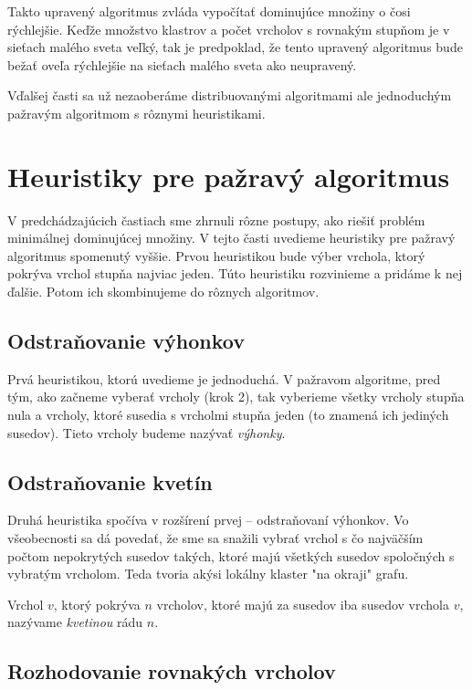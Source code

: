 Takto upravený algoritmus zvláda vypočítať dominujúce množiny o čosi 
rýchlejšie. Keďže množstvo klastrov a počet vrcholov s rovnakým stupňom je v 
sieťach malého sveta veľký, tak je predpoklad, že tento upravený algoritmus 
bude bežať oveľa rýchlejšie na sieťach malého sveta ako neupravený.

Vďalšej časti sa už nezaoberáme distribuovanými algoritmami ale jednoduchým 
pažravým algoritmom s rôznymi heuristikami.


\section{Heuristiky pre pažravý algoritmus}

V predchádzajúcich častiach sme zhrnuli rôzne postupy, ako riešiť problém 
minimálnej dominujúcej množiny. V tejto časti uvedieme heuristiky pre pažravý 
algoritmus spomenutý vyššie. Prvou heuristikou bude výber vrchola, ktorý 
pokrýva vrchol stupňa najviac jeden. Túto heuristiku rozvinieme a pridáme k 
nej ďalšie. Potom ich skombinujeme do rôznych algoritmov.

\subsection{Odstraňovanie výhonkov}

Prvá heuristikou, ktorú uvedieme je jednoduchá. V pažravom algoritme, pred tým, 
ako začneme vyberať vrcholy (krok 2), tak vyberieme všetky vrcholy stupňa nula 
a vrcholy, ktoré susedia s vrcholmi stupňa jeden (to znamená ich jediných 
susedov). Tieto vrcholy budeme nazývať \emph{výhonky}.


\subsection{Odstraňovanie kvetín}

Druhá heuristika spočíva v rozšírení prvej -- odstraňovaní výhonkov. Vo 
všeobecnosti sa dá povedať, že sme sa snažili vybrať vrchol s čo najväčším 
počtom nepokrytých susedov takých, ktoré majú všetkých susedov spoločných s 
vybratým vrcholom. Teda tvoria akýsi lokálny klaster "na okraji" grafu. 

Vrchol $v$, ktorý pokrýva $n$ vrcholov, ktoré majú za susedov iba susedov 
vrchola $v$, nazývame \emph{kvetinou} rádu $n$.

\subsection{Rozhodovanie rovnakých vrcholov}

